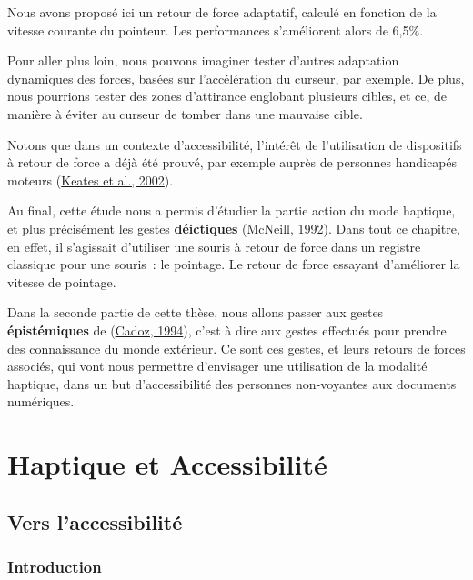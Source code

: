 \documentclass[
]{book}
\begin{document}
Nous avons proposé ici un retour de force adaptatif, calculé en fonction
de la vitesse courante du pointeur. Les performances s'améliorent alors de
6,5\%.

Pour aller plus loin, nous pouvons imaginer tester d'autres adaptation
dynamiques des forces, basées sur l'accélération du curseur, par exemple. De
plus, nous pourrions tester des zones d'attirance englobant plusieurs cibles,
et ce, de manière à éviter au curseur de tomber dans une mauvaise cible.

Notons que dans un contexte d'accessibilité, l'intérêt de l'utilisation de
dispositifs à retour de force a déjà été prouvé, par exemple auprès de
personnes handicapés moteurs (\protect\hyperlink{ref-keates2002use}{Keates et al., 2002}).

Au final, cette étude nous a permis d'étudier la partie action du mode
haptique, et plus précisément \protect\hyperlink{duxe9finitions}{les gestes \textbf{déictiques}}
(\protect\hyperlink{ref-McNeill92}{McNeill, 1992}). Dans tout ce chapitre, en effet, il s'agissait
d'utiliser une souris à retour de force dans un registre classique pour une
souris~: le pointage. Le retour de force essayant d'améliorer la vitesse de
pointage.

Dans la seconde partie de cette thèse, nous allons passer aux gestes
\textbf{épistémiques} de (\protect\hyperlink{ref-cadoz1994realites}{Cadoz, 1994}),
c'est à dire aux gestes effectués pour prendre des connaissance du monde
extérieur. Ce sont ces gestes, et leurs retours de forces associés, qui vont
nous permettre d'envisager une utilisation de la modalité haptique, dans un
but d'accessibilité des personnes non-voyantes aux documents numériques.

\hypertarget{part-haptique-et-accessibilituxe9}{%
\part{Haptique et Accessibilité}\label{part-haptique-et-accessibilituxe9}}

\hypertarget{vers-laccessibilituxe9}{%
\chapter{Vers l'accessibilité}\label{vers-laccessibilituxe9}}

\hypertarget{introduction-3}{%
\section{Introduction}\label{introduction-3}}
\end{document}
